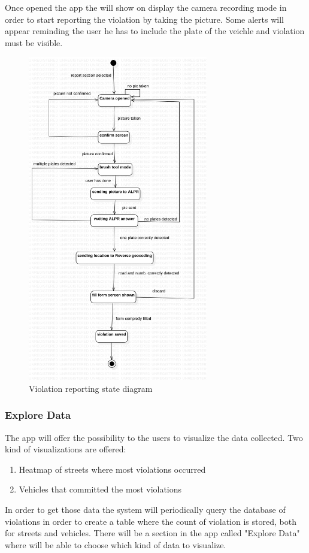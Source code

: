 Once opened the app the will show on display the camera recording mode in order to start reporting the violation by taking the picture. Some alerts will appear reminding the user he has to include the plate of the veichle and violation must be visible.



\begin{figure}
\centering
\includegraphics[width=0.7\textwidth]{Images/violationstate.png}
\caption{\label{fig:violationstatediag} Violation reporting state diagram}
\end{figure}

\subsubsection{Explore Data}
The app will offer the possibility to the users to visualize the data collected.
Two kind of visualizations are offered:
\begin{enumerate}
  \item Heatmap of streets where most violations occurred
  \item Vehicles that committed the most violations \label{blacklistplates}
\end{enumerate}
In order to get those data the system will periodically query the database of violations in order to create a table where the count of violation is stored, both for streets and vehicles.
There will be a section in the app called "Explore Data" where will be able to choose which kind of data to visualize.


